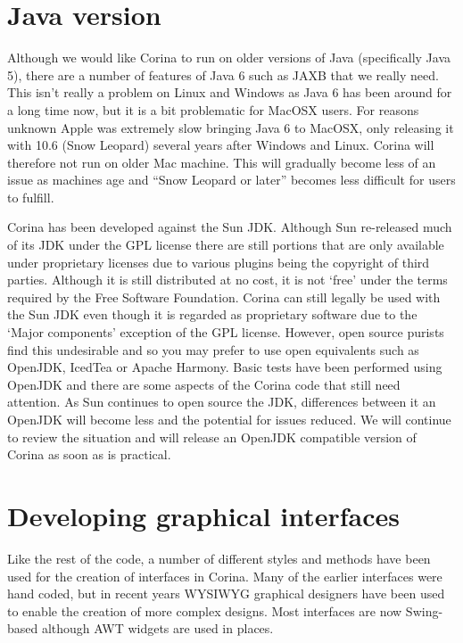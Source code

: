 \section{Java version}
\label{txt:java}
Although we would like Corina to run on older versions of Java (specifically Java 5), there are a number of features of Java 6 such as JAXB that we really need.  This isn't really a problem on Linux and Windows as Java 6 has been around for a long time now, but it is a bit problematic for MacOSX users.  For reasons unknown Apple was extremely slow bringing Java 6 to MacOSX, only releasing it with 10.6 (Snow Leopard) several years after Windows and Linux.  Corina will therefore not run on older Mac machine.  This will gradually become less of an issue as machines age and ``Snow Leopard or later'' becomes less difficult for users to fulfill.  

Corina has been developed against the Sun JDK.  Although Sun re-released much of its JDK under the GPL license there are still portions that are only available under  proprietary licenses due to various plugins being the copyright of third parties.  Although it is still distributed at no cost, it is not `free' under the terms required by the Free Software Foundation.  Corina can still legally be used with the Sun JDK even though it is regarded as proprietary software due to the `Major components' exception of the GPL license.  However, open source purists find this undesirable and so you may prefer to use open equivalents such as OpenJDK, IcedTea or Apache Harmony.   Basic tests have been performed using OpenJDK and there are some aspects of the Corina code that still need attention.  As Sun continues to open source the JDK, differences between it an OpenJDK will become less and the potential for issues reduced.  We will continue to review the situation and will release an OpenJDK compatible version of Corina as soon as is practical.


\section{Developing graphical interfaces}
Like the rest of the code, a number of different styles and methods have been used for the creation of interfaces in Corina.  Many of the earlier interfaces were hand coded, but in recent years WYSIWYG graphical designers have been used to enable the creation of more complex designs.  Most interfaces are now Swing-based although AWT widgets are used in places.

